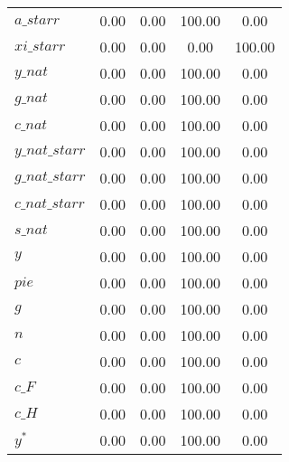 \begin{center}
\begin{longtable}{lcccc}
$a\_starr       $	 & 	                0.00	 & 	                0.00	 & 	              100.00	 & 	                0.00 \\ 
$xi\_starr      $	 & 	                0.00	 & 	                0.00	 & 	                0.00	 & 	              100.00 \\ 
$y\_nat         $	 & 	                0.00	 & 	                0.00	 & 	              100.00	 & 	                0.00 \\ 
$g\_nat         $	 & 	                0.00	 & 	                0.00	 & 	              100.00	 & 	                0.00 \\ 
$c\_nat         $	 & 	                0.00	 & 	                0.00	 & 	              100.00	 & 	                0.00 \\ 
$y\_nat\_starr  $	 & 	                0.00	 & 	                0.00	 & 	              100.00	 & 	                0.00 \\ 
$g\_nat\_starr  $	 & 	                0.00	 & 	                0.00	 & 	              100.00	 & 	                0.00 \\ 
$c\_nat\_starr  $	 & 	                0.00	 & 	                0.00	 & 	              100.00	 & 	                0.00 \\ 
$s\_nat         $	 & 	                0.00	 & 	                0.00	 & 	              100.00	 & 	                0.00 \\ 
${y}            $	 & 	                0.00	 & 	                0.00	 & 	              100.00	 & 	                0.00 \\ 
$pie            $	 & 	                0.00	 & 	                0.00	 & 	              100.00	 & 	                0.00 \\ 
${g}            $	 & 	                0.00	 & 	                0.00	 & 	              100.00	 & 	                0.00 \\ 
$n              $	 & 	                0.00	 & 	                0.00	 & 	              100.00	 & 	                0.00 \\ 
$c              $	 & 	                0.00	 & 	                0.00	 & 	              100.00	 & 	                0.00 \\ 
$c\_F           $	 & 	                0.00	 & 	                0.00	 & 	              100.00	 & 	                0.00 \\ 
$c\_H           $	 & 	                0.00	 & 	                0.00	 & 	              100.00	 & 	                0.00 \\ 
${y^*}          $	 & 	                0.00	 & 	                0.00	 & 	              100.00	 & 	                0.00 \\ 

\end{longtable}
\end{center}
